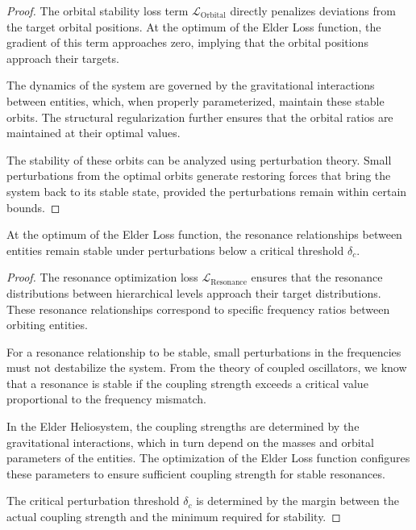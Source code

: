 \begin{proof}
The orbital stability loss term $\mathcal{L}_{\text{Orbital}}$ directly penalizes deviations from the target orbital positions. At the optimum of the Elder Loss function, the gradient of this term approaches zero, implying that the orbital positions approach their targets.

The dynamics of the system are governed by the gravitational interactions between entities, which, when properly parameterized, maintain these stable orbits. The structural regularization further ensures that the orbital ratios are maintained at their optimal values.

The stability of these orbits can be analyzed using perturbation theory. Small perturbations from the optimal orbits generate restoring forces that bring the system back to its stable state, provided the perturbations remain within certain bounds.
\end{proof}

\begin{theorem}
At the optimum of the Elder Loss function, the resonance relationships between entities remain stable under perturbations below a critical threshold $\delta_c$.
\end{theorem}

\begin{proof}
The resonance optimization loss $\mathcal{L}_{\text{Resonance}}$ ensures that the resonance distributions between hierarchical levels approach their target distributions. These resonance relationships correspond to specific frequency ratios between orbiting entities.

For a resonance relationship to be stable, small perturbations in the frequencies must not destabilize the system. From the theory of coupled oscillators, we know that a resonance is stable if the coupling strength exceeds a critical value proportional to the frequency mismatch.

In the Elder Heliosystem, the coupling strengths are determined by the gravitational interactions, which in turn depend on the masses and orbital parameters of the entities. The optimization of the Elder Loss function configures these parameters to ensure sufficient coupling strength for stable resonances.

The critical perturbation threshold $\delta_c$ is determined by the margin between the actual coupling strength and the minimum required for stability.
\end{proof}

